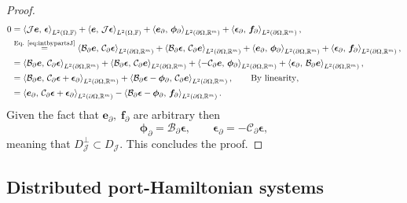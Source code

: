 \begin{proposition}
\begin{proof}
\begin{align*}
0&= \inner[L^2(\Omega, \bbF)]{\mathcal{J}\bm{e}}{\bm{\epsilon}} +\inner[L^2(\Omega, \bbF)]{\bm{e}}{\mathcal{J}\bm{\epsilon}} + \inner[L^2(\partial\Omega, \bbR^m)]{\bm{e}_{\partial}}{\bm{\phi}_{\partial}} +  \inner[L^2(\partial\Omega, \bbR^m)]{\bm{\epsilon}_{\partial}}{\bm{f}_{\partial}}, \\
&\stackrel{\text{Eq. \eqref{eq:intbypartsJ}}}{=} \inner[L^2(\partial\Omega, \bbR^m)]{\mathcal{B}_\partial \bm{e}}{\mathcal{C}_\partial \bm{\epsilon}} + \inner[L^2(\partial\Omega, \bbR^m)]{\mathcal{B}_\partial \bm{\epsilon}}{\mathcal{C}_\partial\bm{e}} + \inner[L^2(\partial\Omega, \bbR^m)]{\bm{e}_{\partial}}{\bm{\phi}_{\partial}} +  \inner[L^2(\partial\Omega, \bbR^m)]{\bm{\epsilon}_{\partial}}{\bm{f}_{\partial}}, \\
&= \inner[L^2(\partial\Omega, \bbR^m)]{\mathcal{B}_\partial \bm{e}}{\mathcal{C}_\partial \bm{\epsilon}} + \inner[L^2(\partial\Omega, \bbR^m)]{\mathcal{B}_\partial \bm{\epsilon}}{\mathcal{C}_\partial\bm{e}} + \inner[L^2(\partial\Omega, \bbR^m)]{-\mathcal{C}_\partial \bm{e}}{\bm{\phi}_{\partial}} +  \inner[L^2(\partial\Omega, \bbR^m)]{\bm{\epsilon}_{\partial}}{\mathcal{B}_\partial\bm{e}}, \\
&= \inner[L^2(\partial\Omega, \bbR^m)]{\mathcal{B}_\partial \bm{e}}{\mathcal{C}_\partial \bm{\epsilon} + \bm{\epsilon}_\partial} + \inner[L^2(\partial\Omega, \bbR^m)]{\mathcal{B}_\partial \bm{\epsilon} - \bm{\phi}_\partial}{\mathcal{C}_\partial\bm{e}}, \qquad \text{By linearity}, \\
&= \inner[L^2(\partial\Omega, \bbR^m)]{\bm{e}_\partial}{\mathcal{C}_\partial \bm{\epsilon} + \bm{\epsilon}_\partial} - \inner[L^2(\partial\Omega, \bbR^m)]{\mathcal{B}_\partial \bm{\epsilon} - \bm{\phi}_\partial}{\bm{f}_\partial}. \\
\end{align*}
Given the fact that $\bm{e}_\partial, \; \bm{f}_\partial$ are arbitrary then
\begin{equation*}
\bm{\phi}_{\partial} = \mathcal{B}_\partial \bm{\epsilon}, \qquad 
\bm{\epsilon}_{\partial} = -\mathcal{C}_\partial\bm{\epsilon},
\end{equation*}
meaning that ${D}_{\mathcal{J}}^\perp \subset {D}_{\mathcal{J}}$. This concludes the proof.
\end{proof}
\end{proposition}


\subsection{Distributed port-Hamiltonian systems}

